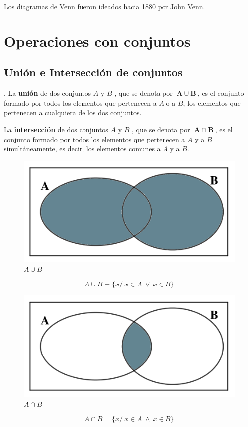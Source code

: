 Los diagramas de Venn fueron ideados hacia 1880 por John Venn.

\section{Operaciones con conjuntos}
\subsection{Unión e Intersección de conjuntos}

\begin{definition}
	. La \textbf{unión} de dos conjuntos $A \text{ y } B$	, que se denota por $\ \boldsymbol{A\cup B}\ $, es el conjunto formado por todos los elementos que pertenecen a $A$ o a $B$, los elementos que pertenecen a cualquiera de los dos conjuntos.
	
	\vspace{3mm} La \textbf{intersección} de dos conjuntos $A \text{ y } B$	, que se denota por $\ \boldsymbol{A\cap B}\ $, es el conjunto formado por todos los elementos que pertenecen a $A$ y a $B$ simultáneamente, es decir, los elementos comunes a $A$ y a $B$.
	
	\begin{multicols}{2}
	\begin{figure}[H]
	\centering
	\includegraphics[width=.45\textwidth]{imagenes/apendices/app03.png}
	\caption*{$A\cup B$}
	\end{figure}
	\vspace{-13mm}
	$$A\cup B=\{x/\ x\in A \ \vee \ x \in B\}$$
	\begin{figure}[H]
	\centering
	\includegraphics[width=.45\textwidth]{imagenes/apendices/app04.png}
	\caption*{$A\cap B$}
	\end{figure}
	\vspace{-13mm}
	$$A\cap B=\{x/\ x\in A \ \wedge \ x \in B\}$$
	\end{multicols}
\end{definition}


